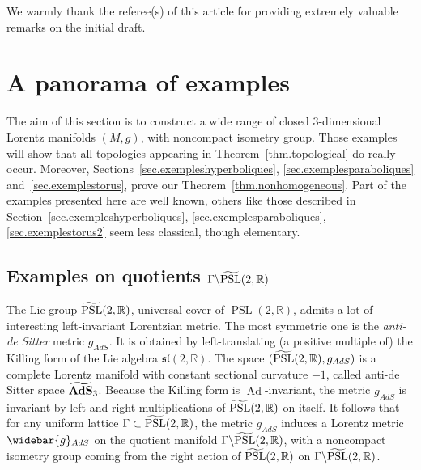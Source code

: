 \documentclass[11pt]{article}
\theoremstyle{definition}
\numberwithin{equation}{section}
\numberwithin{figure}{section}
\numberwithin{table}{section}
\DeclareMathOperator{\Ad}{Ad}
\DeclareMathOperator{\PSL}{PSL}
\newcommand*\RR{\mathbb{R}}
\let\oldtilde\tilde
\renewcommand*\tilde[1]{\mathchoice{\widetilde{#1}}{\widetilde{#1}}{\widetilde{#1}}{\oldtilde{#1}}}
\let\oldbar\bar
\renewcommand*{\bar}[1]{\mathchoice{\widebar{#1}}{\widebar{#1}}{\oldbar{#1}}{\oldbar{#1}}}
\renewcommand*{\overline}{\bar}
\begin{document}
We warmly thank the referee(s) of this article for providing extremely valuable remarks on the initial draft.

\section{A panorama of examples}\label{sec.panorama}

The aim of this section is to construct a wide range of closed $3$-dimensional Lorentz manifolds $(M,g)$, with noncompact isometry group. Those examples will show that all topologies appearing in Theorem~\ref{thm.topological} do really occur. Moreover, Sections~\ref{sec.exempleshyperboliques}, \ref{sec.exemplesparaboliques} and~\ref{sec.exemplestorus}, prove our Theorem~\ref{thm.nonhomogeneous}. Part of the examples presented here are well known, others like those described in Section~\ref{sec.exempleshyperboliques}, \ref{sec.exemplesparaboliques}, \ref{sec.exemplestorus2} seem less classical, though elementary.


\subsection{Examples on quotients \texorpdfstring{$\Gamma \backslash \tilde{\PSL}(2,\RR)$}{Gamma backslash PSL(2, RR)}}\label{sec.exemplessl2}

The Lie group $\tilde{\PSL}(2,\RR)$, universal cover of ${\PSL}(2,\RR)$, admits a lot of interesting left-invariant Lorentzian metric. The most symmetric one is the \emph{anti-de Sitter} metric $g_{AdS}$. It is obtained by left-translating (a positive multiple of) the Killing form of the Lie algebra $\mathfrak{sl}(2,\RR)$. The space $(\tilde{\PSL}(2,\RR),g_{AdS})$ is a complete Lorentz manifold with constant sectional curvature $-1$, called anti-de Sitter space $\tilde{\bf{AdS}}_3$. Because the Killing form is $\Ad$-invariant, the metric $g_{AdS}$ is invariant by left and right multiplications of $\tilde{\PSL}(2,\RR)$ on itself. It follows that for any uniform lattice $\Gamma \subset \tilde{\PSL}(2,\RR)$, the metric $g_{AdS}$ induces a Lorentz metric $\overline{g}_{AdS}$ on the quotient manifold $\Gamma \backslash \tilde{\PSL}(2,\RR)$, with a noncompact isometry group coming from the right action of $\tilde{\PSL}(2,\RR)$ on $\Gamma \backslash \tilde{\PSL}(2,\RR)$.
\end{document}
